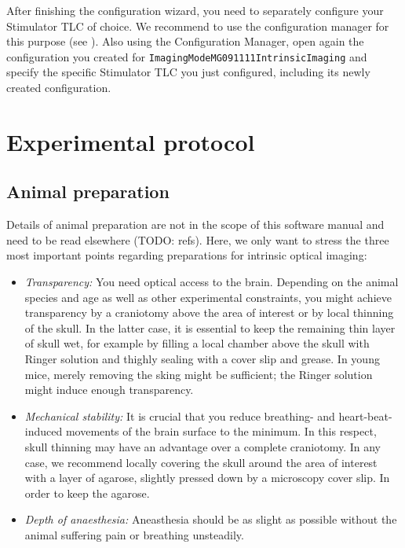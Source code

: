 After finishing the configuration wizard, you need to separately configure your Stimulator \ac{TLC} of choice. We recommend to use the configuration manager for this purpose (see ). Also using the Configuration Manager, open again the configuration you created for \verb+ImagingModeMG091111IntrinsicImaging+ and specify the specific Stimulator \ac{TLC} you just configured, including its newly created configuration.


\section{Experimental protocol}\label{sec:ios_experimentProtocol}

\subsection{Animal preparation}
Details of animal preparation are not in the scope of this software manual and need to be read elsewhere (TODO: refs). Here, we only want to stress the three most important points regarding preparations for intrinsic optical imaging:
\begin{itemize}
	\item \textit{Transparency:} You need optical access to the brain. Depending on the animal species and age as well as other experimental constraints, you might achieve transparency by a craniotomy above the area of interest or by local thinning of the skull. In the latter case, it is essential to keep the remaining thin layer of skull wet, for example by filling a local chamber above the skull with Ringer solution and thighly sealing with a cover slip and grease. In young mice, merely removing the sking might be sufficient; the Ringer solution might induce enough transparency.
	\item \textit{Mechanical stability:} It is crucial that you reduce breathing- and heart-beat-induced movements of the brain surface to the minimum. In this respect, skull thinning may have an advantage over a complete craniotomy. In any case, we recommend locally covering the skull around the area of interest with a layer of agarose, slightly pressed down by a microscopy cover slip. In order to keep the agarose.
	\item \textit{Depth of anaesthesia:} Aneasthesia should be as slight as possible without the animal suffering pain or breathing unsteadily.
\end{itemize}


